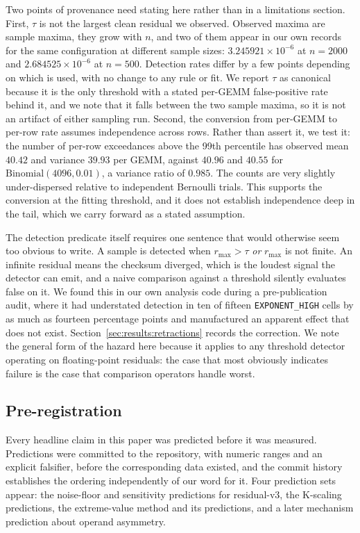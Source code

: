 Two points of provenance need stating here rather than in a limitations
section. First, $\tau$ is not the largest clean residual we observed. Observed
maxima are sample maxima, they grow with $n$, and two of them appear in our own
records for the same configuration at different sample sizes:
$3.245921 \times 10^{-6}$ at $n = 2000$ and $2.684525 \times 10^{-6}$ at
$n = 500$. Detection rates differ by a few points depending on which is used,
with no change to any rule or fit. We report $\tau$ as canonical because it is
the only threshold with a stated per-GEMM false-positive rate behind it, and we
note that it falls between the two sample maxima, so it is not an artifact of
either sampling run. Second, the conversion from per-GEMM to per-row rate
assumes independence across rows. Rather than assert it, we test it: the number
of per-row exceedances above the 99th percentile has observed mean $40.42$ and
variance $39.93$ per GEMM, against $40.96$ and $40.55$ for
$\mathrm{Binomial}(4096, 0.01)$, a variance ratio of $0.985$. The counts are
very slightly under-dispersed relative to independent Bernoulli trials. This
supports the conversion at the fitting threshold, and it does not establish
independence deep in the tail, which we carry forward as a stated assumption.

The detection predicate itself requires one sentence that would otherwise seem
too obvious to write. A sample is detected when $r_{\max} > \tau$
\emph{or} $r_{\max}$ is not finite. An infinite residual means the checksum
diverged, which is the loudest signal the detector can emit, and a naive
comparison against a threshold silently evaluates false on it. We found this in
our own analysis code during a pre-publication audit, where it had understated
detection in ten of fifteen \texttt{EXPONENT\_HIGH} cells by as much as
fourteen percentage points and manufactured an apparent effect that does not
exist. Section~\ref{sec:results:retractions} records the correction. We note
the general form of the hazard here because it applies to any threshold
detector operating on floating-point residuals: the case that most obviously
indicates failure is the case that comparison operators handle worst.

\subsection{Pre-registration}
\label{sec:method:prereg}

Every headline claim in this paper was predicted before it was measured.
Predictions were committed to the repository, with numeric ranges and an
explicit falsifier, before the corresponding data existed, and the commit
history establishes the ordering independently of our word for it. Four
prediction sets appear: the noise-floor and sensitivity predictions for
residual-v3, the K-scaling predictions, the extreme-value method and its
predictions, and a later mechanism prediction about operand asymmetry.

